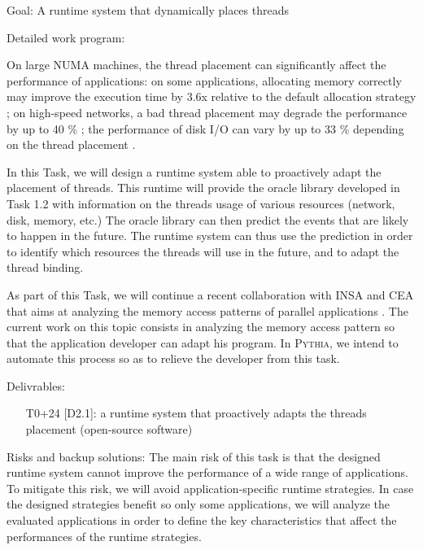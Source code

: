 \documentclass[a4paper,11pt,defblank]{article}
\newcommand{\pname}{\textsc{Pythia}\xspace}
\begin{document}
\begin{paragraph}{Goal:}
A runtime system that dynamically places threads
\end{paragraph}

\begin{paragraph}{Detailed work program:}

  On large NUMA machines, the thread placement can significantly
  affect the performance of applications: on some applications,
  allocating memory correctly may improve the execution time by 3.6x
  relative to the default allocation strategy \cite{carrefour} ; on
  high-speed networks, a bad thread placement may degrade the
  performance by up to 40 \% \cite{nuioa}; the performance of disk I/O
  can vary by up to 33 \% depending on the thread placement
  \cite{diskio_numa}.

  In this Task, we will design a runtime system able to proactively
  adapt the placement of threads. This runtime will provide the oracle
  library developed in Task 1.2 with information on the threads usage
  of various resources (network, disk, memory, etc.) The oracle
  library can then predict the events that are likely to happen in the
  future. The runtime system can thus use the prediction in order to
  identify which resources the threads will use in the future, and to
  adapt the thread binding.

  As part of this Task, we will continue a recent collaboration with
  INSA and CEA that aims at analyzing the memory access patterns of
  parallel applications \cite{numamma}. The current work on this topic
  consists in analyzing the memory access pattern so that the
  application developer can adapt his program. In \pname, we intend to
  automate this process so as to relieve the developer from this task.

\end{paragraph}

\begin{paragraph}{Delivrables:}
  \begin{itemize}
  \item[T0+24] [D2.1]: a runtime system that proactively adapts the threads placement (open-source software)
  \end{itemize}
\end{paragraph}

\begin{paragraph}{Risks and backup solutions:}
  The main risk of this task is that the designed runtime system
  cannot improve the performance of a wide range of applications. To
  mitigate this risk, we will avoid application-specific runtime
  strategies. In case the designed strategies benefit so only some
  applications, we will analyze the evaluated applications in order to
  define the key characteristics that affect the performances of the
  runtime strategies.
\end{paragraph}
\end{document}
